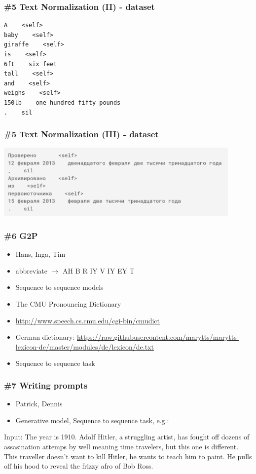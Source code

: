 \documentclass{beamer}
\begin{document}
\begin{frame}[fragile]
\frametitle{\#5 Text Normalization (II) - dataset}
    \begin{verbatim}
A    <self>
baby    <self>
giraffe    <self>
is    <self>
6ft    six feet
tall    <self>
and    <self>
weighs    <self>
150lb    one hundred fifty pounds
.    sil
  \end{verbatim}
\end{frame}

\begin{frame}[fragile]
\frametitle{\#5 Text Normalization (III) - dataset}
    \begin{center}
  		\includegraphics[width=0.9\textwidth]{russian_text_norm}
  	\end{center}
\end{frame}

\begin{frame}
\frametitle{\#6 G2P}
 \begin{itemize}
    \item Hans, Inga, Tim
    \item abbreviate $\rightarrow$ AH B R IY V IY EY T
    \item Sequence to sequence models
    \item The CMU Pronouncing Dictionary 
    \item \url{http://www.speech.cs.cmu.edu/cgi-bin/cmudict}
    \item German dictionary: \url{https://raw.githubusercontent.com/marytts/marytts-lexicon-de/master/modules/de/lexicon/de.txt}
    \item Sequence to sequence task
 \end{itemize}
\end{frame}

\begin{frame}[fragile]
\frametitle{\#7 Writing prompts}
 \begin{itemize}
    \item Patrick, Dennis
    \item Generative model, Sequence to sequence task, e.g.:
 \end{itemize}

  \begin{footnotesize}
  
Input:
The year is 1910. Adolf Hitler, a struggling artist, has fought off dozens of assasination attemps by well meaning time travelers, but this one is different. This traveller doesn't want to kill Hitler, he wants to teach him to paint. He pulls off his hood to reveal the frizzy afro of Bob Ross.

  \end{footnotesize}
\end{frame}
\end{document}
